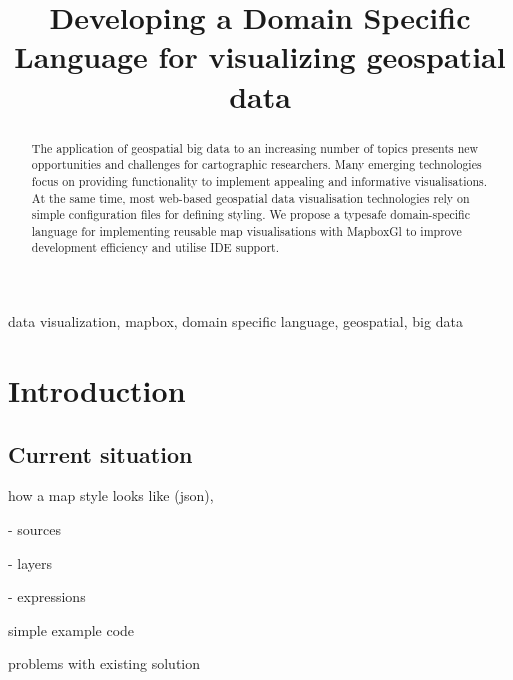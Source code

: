 \documentclass[conference]{IEEEtran}
\begin{document}
\title{Developing a Domain Specific Language for visualizing geospatial data}

\author{
\and
{}
}

\maketitle

\begin{abstract}
The application of geospatial big data to an increasing number of topics presents new opportunities and challenges for cartographic researchers. Many emerging technologies focus on providing functionality to implement appealing and informative visualisations. At the same time, most web-based geospatial data visualisation technologies rely on simple configuration files for defining styling. We propose a typesafe domain-specific language for implementing reusable map visualisations with MapboxGl to improve development efficiency and utilise IDE support.
\end{abstract}

\begin{IEEEkeywords}
data visualization, mapbox, domain specific language, geospatial, big data
\end{IEEEkeywords}

\section{Introduction}

\subsection{Current situation}

how a map style looks like (json), 

- sources 

- layers

- expressions

simple example code

problems with existing solution
\end{document}
